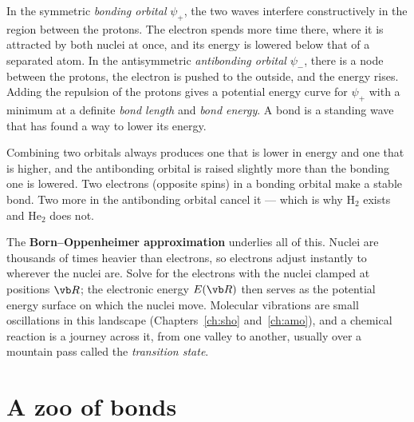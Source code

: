 In the symmetric \emph{bonding orbital} $\psi_+$, the two waves interfere constructively in the region between the protons. The electron spends more time there, where it is attracted by both nuclei at once, and its energy is lowered below that of a separated atom. In the antisymmetric \emph{antibonding orbital} $\psi_-$, there is a node between the protons, the electron is pushed to the outside, and the energy rises. Adding the repulsion of the protons gives a potential energy curve for $\psi_+$ with a minimum at a definite \emph{bond length} and \emph{bond energy}. A bond is a standing wave that has found a way to lower its energy.

\begin{keyidea}
Combining two orbitals always produces one that is lower in energy and one that is higher, and the antibonding orbital is raised slightly more than the bonding one is lowered. Two electrons (opposite spins) in a bonding orbital make a stable bond. Two more in the antibonding orbital cancel it --- which is why H$_2$ exists and He$_2$ does not.
\end{keyidea}

The \textbf{Born--Oppenheimer approximation} underlies all of this. Nuclei are thousands of times heavier than electrons, so electrons adjust instantly to wherever the nuclei are. Solve for the electrons with the nuclei clamped at positions $\vb R$; the electronic energy $E(\vb R)$ then serves as the potential energy surface on which the nuclei move. Molecular vibrations are small oscillations in this landscape (Chapters~\ref{ch:sho} and~\ref{ch:amo}), and a chemical reaction is a journey across it, from one valley to another, usually over a mountain pass called the \emph{transition state}.

\section{A zoo of bonds}

